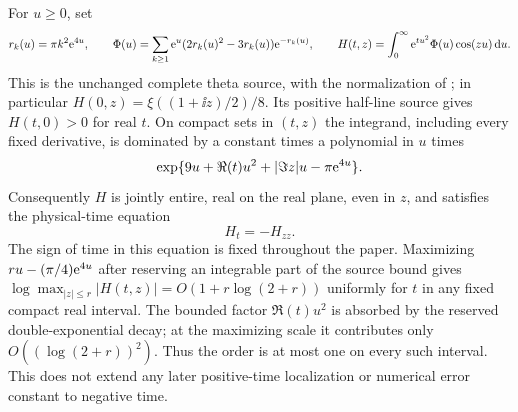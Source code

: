 For $u\ge0$, set
\begin{equation}
 r_k(u)=\pi k^2\mathrm e^{4u},\qquad
 \Phi(u)=\sum_{k\ge1}\mathrm e^u(2r_k(u)^2-3r_k(u))\mathrm e^{-r_k(u)},\qquad
 H(t,z)=\int_0^\infty\mathrm e^{tu^2}\Phi(u)\cos(zu)\,\mathrm d u.
 \label{eq:source}
\end{equation}
This is the unchanged complete theta source, with the normalization of
\cite{BakerBase}; in particular $H(0,z)=\xi((1+\ii z)/2)/8$.
Its positive half-line source gives $H(t,0)>0$ for real $t$.
On compact sets in $(t,z)$ the integrand, including every fixed derivative,
is dominated by a constant times a polynomial in $u$ times
\[
 \exp\{9u+\Re(t)u^2+|\Im z|u-\pi\mathrm e^{4u}\}.
\]
Consequently $H$ is jointly entire, real on the real plane, even in $z$,
and satisfies the physical-time equation
\begin{equation}
 H_t=-H_{zz}.
 \label{eq:heat}
\end{equation}
The sign of time in this equation is fixed throughout the paper.
Maximizing $ru-(\pi/4)\mathrm e^{4u}$ after reserving an integrable part
of the source bound gives
$\log\max_{|z|\le r}|H(t,z)|=O(1+r\log(2+r))$
uniformly for $t$ in any fixed compact real interval. The bounded factor
$\Re(t)u^2$ is absorbed by the reserved double-exponential decay; at the
maximizing scale it contributes only $O((\log(2+r))^2)$. Thus the order
is at most one on every such interval. This does not extend any later
positive-time localization or numerical error constant to negative time.

